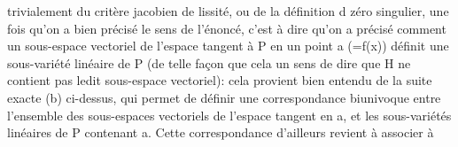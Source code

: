 trivialement du critère jacobien de lissité, ou de la définition d
zéro singulier, une fois qu'on a bien précisé le sens de l'énoncé,
c'est à dire qu'on a précisé comment un  sous-espace
vectoriel de l'espace tangent à P en un point a (=f(x)) définit une
sous-variété linéaire de P (de telle façon que cela  un sens de dire
que H ne contient pas ledit sous-espace vectoriel): cela provient
bien entendu de la suite exacte (b) ci-dessus, qui permet de
définir une correspondance biunivoque entre l'ensemble des sous-espaces
vectoriels de l'espace tangent en a, et les sous-variétés linéaires de
P contenant a. Cette correspondance d'ailleurs revient à associer à

